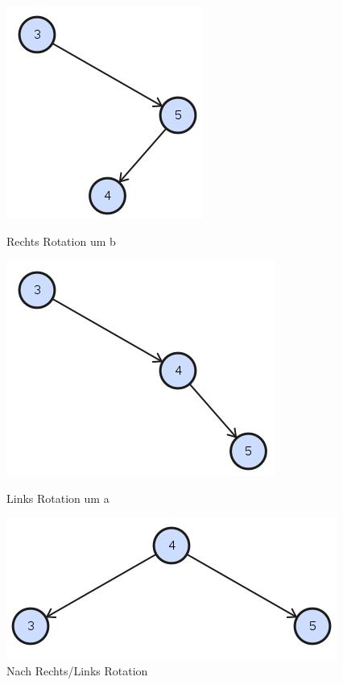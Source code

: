\begin{figure}[h!]
	\centering
	\begin{minipage}[t]{0.4\textwidth}
		\centering
		\includegraphics[width=0.7\linewidth]{images/avl_rightleft_rotation_1}
		\caption{Rechts Rotation um b}
		\label{fig:trieexample}
	\end{minipage}
	\begin{minipage}[t]{0.4\textwidth}
		\centering
		\includegraphics[width=0.9\linewidth]{images/avl_left_rotation_1}
		\caption{Links Rotation um a}
		\label{fig:searchtreeinsert2}
	\end{minipage}
	\begin{minipage}[t]{0.4\textwidth}
		\centering
		\includegraphics[width=0.9\linewidth]{images/avl_rotation_final}
		\caption{Nach Rechts/Links Rotation}
		\label{fig:searchtreeinsert2}
	\end{minipage}
\end{figure}
